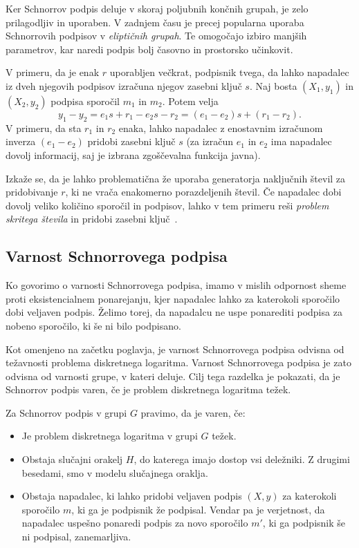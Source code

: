 \documentclass[isrm2, tisk]{fmfdelo}
\begin{document}
Ker Schnorrov podpis deluje v skoraj poljubnih končnih grupah, je zelo prilagodljiv in uporaben.
V zadnjem času je precej popularna uporaba Schnorrovih podpisov v \textit{eliptičnih grupah}.
Te omogočajo izbiro manjših parametrov, kar naredi podpis bolj časovno in prostorsko učinkovit.

\begin{opomba}
\label{opomba:nonce}
    V primeru, da je enak $r$ uporabljen večkrat, podpisnik tvega, da lahko napadalec iz dveh njegovih
    podpisov izračuna njegov zasebni ključ $s$. Naj bosta $(X_1, y_1)$ in $(X_2, y_2)$ podpisa sporočil
    $m_1$ in $m_2$. Potem velja
    $$
    y_1 - y_2 = e_1 s + r_1 - e_2 s - r_2 = (e_1 - e_2)s + (r_1 - r_2).
    $$
    V primeru, da sta $r_1$ in $r_2$ enaka, lahko napadalec z enostavnim izračunom inverza $(e_1 - e_2)$
    pridobi zasebni ključ $s$ (za izračun $e_1$ in $e_2$ ima napadalec dovolj informacij, saj je
    izbrana zgoščevalna funkcija javna).

    Izkaže se, da je lahko problematična že uporaba generatorja naključnih števil za pridobivanje
    $r$, ki ne vrača enakomerno porazdeljenih števil. Če napadalec dobi dovolj veliko količino
    sporočil in podpisov, lahko v tem primeru reši \textit{problem skritega števila} in pridobi
    zasebni ključ~\cite{tibouchi2017attacks}.
\end{opomba}

\subsection{Varnost Schnorrovega podpisa}
\label{sec:schnorr-sec}
Ko govorimo o varnosti Schnorrovega podpisa, imamo v mislih odpornost sheme proti eksistencialnem
ponarejanju, kjer napadalec lahko za katerokoli sporočilo dobi veljaven podpis. Želimo torej, da
napadalcu ne uspe ponarediti podpisa za nobeno sporočilo, ki še ni bilo podpisano.

Kot omenjeno na začetku poglavja, je varnost Schnorrovega podpisa odvisna od težavnosti problema
diskretnega logaritma. Varnost Schnorrovega podpisa je zato odvisna od varnosti grupe, v kateri deluje.
Cilj tega razdelka je pokazati, da je Schnorrov podpis varen, če je problem diskretnega logaritma
težek.

\begin{definicija}
    Za Schnorrov podpis v grupi $G$ pravimo, da je varen, če:
    \begin{itemize}
        \item Je problem diskretnega logaritma v grupi $G$ težek.
        \item Obstaja slučajni orakelj $H$, do katerega imajo dostop vsi deležniki. Z drugimi besedami,
            smo v modelu slučajnega oraklja.
        \item Obstaja napadalec, ki lahko pridobi veljaven podpis $(X, y)$ za katerokoli sporočilo $m$,
            ki ga je podpisnik že podpisal. Vendar pa je verjetnost, da napadalec uspešno ponaredi
            podpis za novo sporočilo $m'$, ki ga podpisnik še ni podpisal, zanemarljiva.
    \end{itemize}
\end{definicija}
\end{document}
